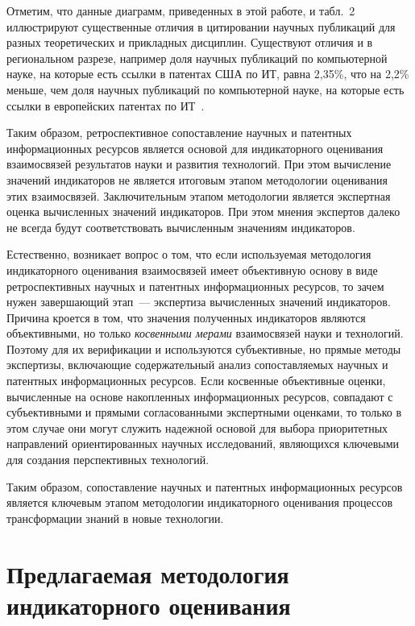 \begin{multicols}{2}
  Отметим, что данные диаграмм, приведенных в этой работе, и табл.~2 иллюстрируют 
существенные отличия в цитировании научных публикаций для разных теоретических и 
прикладных дисциплин. Существуют отличия и в региональном разрезе, например доля 
научных публикаций по компьютерной науке, на которые есть ссылки в патентах США по ИТ, 
равна 2,35\%, что на 2,2\% меньше, чем доля научных публикаций по компьютерной науке, на 
которые есть ссылки в европейских патентах по ИТ~\cite{46-zat}.
  
  Таким образом, ретроспективное сопоставление научных и патентных информационных 
ресурсов является основой для индикаторного оценивания взаимосвязей результатов науки и 
развития технологий. При этом вычисление значений индикаторов не является итоговым 
этапом методологии оценивания этих взаимосвязей. Заключительным этапом методологии 
является экспертная оценка вычисленных значений индикаторов. При этом мнения экспертов 
далеко не всегда будут соответствовать вычисленным значениям индикаторов.
  
  Естественно, возникает вопрос о том, что если используемая методология индикаторного 
оценивания взаимосвязей имеет объективную основу в виде ретроспективных научных и 
патентных информационных ресурсов, то зачем нужен завершающий этап~--- экспертиза 
вычисленных значений индикаторов. Причина кроется в том, что значения полученных 
индикаторов являются объективными, но только \textit{косвенными мерами} взаимосвязей 
науки и технологий. Поэтому для их верификации и используются субъективные, но прямые 
методы экспертизы, включающие содержательный анализ сопоставляемых научных и 
патентных информационных ресурсов. Если косвенные объективные оценки, вычисленные на 
основе накопленных информационных ресурсов, совпадают с субъективными и прямыми 
согласованными экспертными оценками, то только в этом случае они могут служить надежной 
основой для выбора приоритетных направлений ориентированных научных исследований, 
являющихся ключевыми для создания перспективных технологий.
  
  Таким образом, сопоставление научных и патентных информационных ресурсов является 
ключевым этапом методологии индикаторного оценивания процессов трансформации знаний в 
новые технологии.

\section{Предлагаемая методология индикаторного оценивания}
    

\end{multicols}
